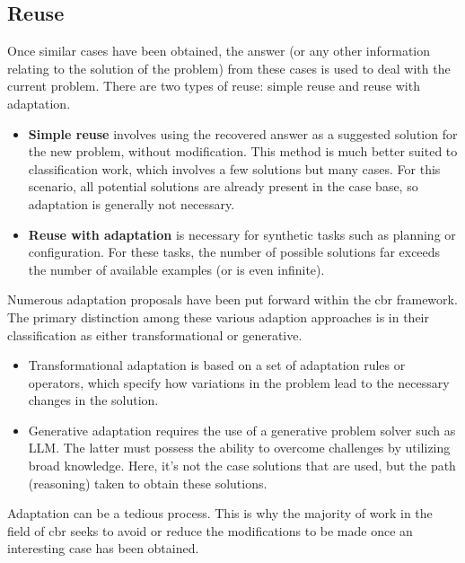     \subsection{Reuse}
    Once similar cases have been obtained, the answer (or any other information relating to the solution of the problem) from these cases is used to deal with the current problem. There are two types of reuse: simple reuse and reuse with adaptation. 
    
    \begin{itemize}
        \item \textbf{Simple reuse} involves using the recovered answer as a suggested solution for the new problem, without modification. This method is much better suited to classification work, which involves a few solutions but many cases.  For this scenario, all potential solutions are already present in the case base, so adaptation is generally not necessary. 
        
        \item \textbf{Reuse with adaptation} is necessary for synthetic tasks such as planning or configuration. For these tasks, the number of possible solutions far exceeds the number of available examples (or is even infinite).
    \end{itemize}

    Numerous adaptation proposals have been put forward within the \acrshort{cbr} framework. The primary distinction among these various adaption approaches is in their classification as either transformational or generative.
    
    \begin{itemize}
        \item Transformational adaptation is based on a set of adaptation rules or operators, which specify how variations in the problem lead to the necessary changes in the solution.  
        
        \item Generative adaptation requires the use of a generative problem solver such as LLM. The latter must possess the ability to overcome challenges by utilizing broad knowledge. Here, it's not the case solutions that are used, but the path (reasoning) taken to obtain these solutions. 
    \end{itemize}

    Adaptation can be a tedious process. This is why the majority of work in the field of \acrshort{cbr} seeks to avoid or reduce the modifications to be made once an interesting case has been obtained.


